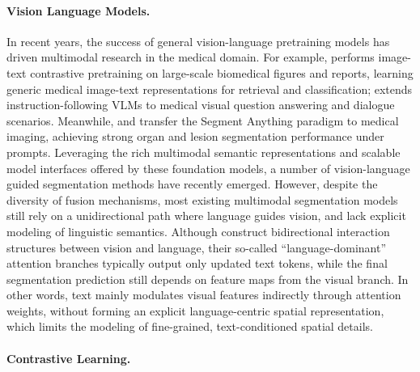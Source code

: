 \documentclass{article} %
\begin{document}
\paragraph{Vision Language Models.}

In recent years, the success of general vision-language pretraining models has driven multimodal research in the medical domain. For example, \citet{zhang2025biomedclip} performs image-text contrastive pretraining on large-scale biomedical figures and reports, learning generic medical image-text representations for retrieval and classification; \citet{li2023llava} extends instruction-following VLMs to medical visual question answering and dialogue scenarios. Meanwhile, \citet{cheng2023sammed2d} and \citet{ma2024segment} transfer the Segment Anything paradigm to medical imaging, achieving strong organ and lesion segmentation performance under prompts. Leveraging the rich multimodal semantic representations and scalable model interfaces offered by these foundation models, a number of vision-language guided segmentation methods have recently emerged\citep{tomar2022tganet,huemann2024contextual,li2023lvit,wang2025medlangvit,wang2025towards}. However, despite the diversity of fusion mechanisms, most existing multimodal segmentation models still rely on a unidirectional path where language guides vision, and lack explicit modeling of linguistic semantics. Although \citet{liu2023multi,cho2023cross,sultan2025bipvl} construct bidirectional interaction structures between vision and language, their so-called ``language-dominant'' attention branches typically output only updated text tokens, while the final segmentation prediction still depends on feature maps from the visual branch. In other words, text mainly modulates visual features indirectly through attention weights, without forming an explicit language-centric spatial representation, which limits the modeling of fine-grained, text-conditioned spatial details.

\paragraph{Contrastive Learning.}
\end{document}
